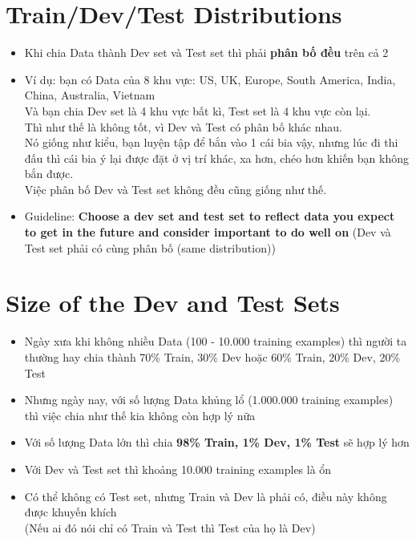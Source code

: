 \documentclass[12pt,a4paper]{report}
\begin{document}
	\section{Train/Dev/Test Distributions}
		\begin{itemize}
			\item Khi chia Data thành Dev set và Test set thì phải \textbf{phân 
			bố đều} trên cả 2
			\item Ví dụ: bạn có Data của 8 khu vực: US, UK, Europe, South 
			America, India, China, Australia, Vietnam\\
			Và bạn chia Dev set là 4 khu vực bất kì, Test set là 4 khu vực còn 
			lại.\\
			Thì như thế là không tốt, vì Dev và Test có phân bố khác nhau.\\
			Nó giống như kiểu, bạn luyện tập để bắn vào 1 cái bia vậy, nhưng 
			lúc đi thi đấu thì cái bia ý lại được đặt ở vị trí khác, xa hơn, 
			chéo hơn khiến bạn không bắn được.\\
			Việc phân bố Dev và Test set không đều cũng giống như thế.
			\item Guideline: \textbf{Choose a dev set and test set to reflect
			data you expect to get in the future and consider important to do
			well on} (Dev và Test set phải có cùng phân bố (same 
			distribution))
		\end{itemize}
	\section{Size of the Dev and Test Sets}
		\begin{itemize}
			\item Ngày xưa khi không nhiều Data (100 - 10.000 training 
			examples)
			thì người ta thường hay chia thành 70\% Train, 30\% Dev hoặc 60\% 
			Train, 20\% Dev, 20\% Test
			\item Nhưng ngày nay, với số lượng Data khủng lổ (1.000.000 
			training examples) thì việc chia như thế kia không còn hợp lý nữa
			\item Với số lượng Data lớn thì chia \textbf{98\% Train, 1\% Dev, 
			1\% Test} sẽ hợp lý hơn
			\item Với Dev và Test set thì khoảng 10.000 training examples là 
			ổn
			\item Có thể không có Test set, nhưng Train và Dev là phải có, 
			điều này không được khuyến khích\\ (Nếu ai đó nói chỉ có Train và 
			Test thì Test của họ là Dev)
		\end{itemize}
\end{document}
